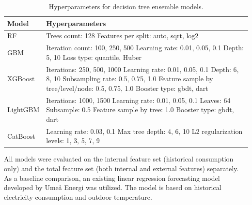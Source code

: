 \begin{table}[h!tbp]%
    \centering
    \caption{Hyperparameters for decision tree ensemble models.}
    \label{tab:hyperparameters}
    \small
    \begin{tabularx}{\linewidth}{l p{7cm}}
        \textbf{Model} & \textbf{Hyperparameters}        \\
        \midrule
        RF             & Trees count: 128
        \newline Features per split: auto, sqrt, log2    \\
        \midrule
        GBM            & Iteration count: 100, 250, 500
        \newline Learning rate: 0.01, 0.05, 0.1
        \newline Depth: 5, 10
        \newline Loss type: quantile, Huber              \\
        \midrule
        XGBoost        & Iterations: 250, 500, 1000
        \newline Learning rate: 0.01, 0.05, 0.1
        \newline Depth: 6, 8, 10
        \newline Subsampling rate: 0.5, 0.75, 1.0
        \newline Feature sample by tree/level/node: 0.5, 0.75, 1.0
        \newline Booster type: gbdt, dart                \\
        \midrule
        LightGBM       & Iterations: 1000, 1500
        \newline Learning rate: 0.01, 0.05, 0.1
        \newline Leaves: 64
        \newline Subsample: 0.5
        \newline Feature sample by tree: 1.0
        \newline Booster type: gbdt, dart                \\
        \midrule
        CatBoost       & Learning rate: 0.03, 0.1
        \newline Max tree depth: 4, 6, 10
        \newline L2 regularization levels: 1, 3, 5, 7, 9 \\
    \end{tabularx}
\end{table}

All models were evaluated on the internal feature set (historical consumption only) and the total feature set (both internal and external features) separately. As a baseline comparison, an existing linear regression forecasting model developed by Umeå Energi was utilized. The model is based on historical electricity consumption and outdoor temperature.


